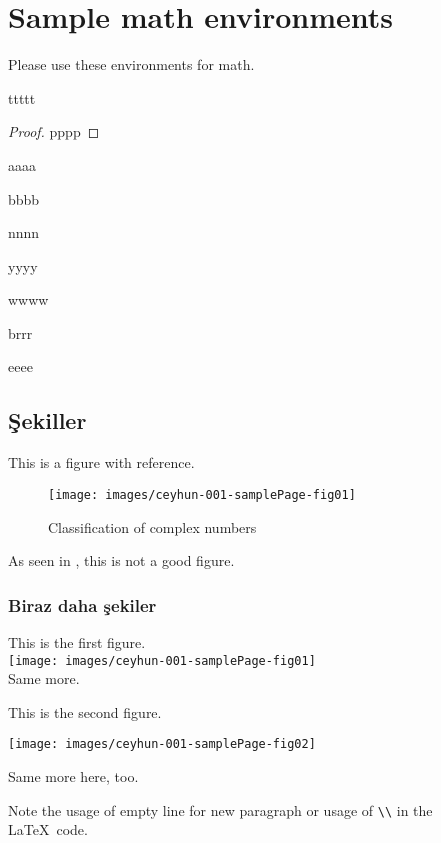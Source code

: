 \documentclass[11pt]{amsbook}
\begin{document}
\section{Sample math environments}
Please use these environments for math.


\begin{theorem}
	ttttt
\end{theorem}
\begin{proof}
	pppp
\end{proof}
\begin{lemma}
	aaaa
\end{lemma}
\begin{proposition}
	bbbb
\end{proposition}
\begin{corollary}
	nnnn
\end{corollary}
\begin{conjecture}
	yyyy
\end{conjecture}
\begin{remark}
	wwww
\end{remark}
\begin{assumption}
	brrr
\end{assumption}
\begin{example}
	eeee
\end{example}




\subsection{Şekiller}
This is a figure with reference.
\begin{figure}[htb]
	\centering
	\texttt{[image: images/ceyhun-001-samplePage-fig01]}
	\caption{Classification of complex numbers}
	\label{fig:classificationOfComplexNumbersA}
\end{figure}

As seen in , this is not a good figure.


\subsubsection{Biraz daha şekiler}

This is the first figure.\\
\texttt{[image: images/ceyhun-001-samplePage-fig01]}\\
Same more.

This is the second figure.

\texttt{[image: images/ceyhun-001-samplePage-fig02]}

Same more here, too.

Note the usage of empty line for new paragraph or usage of \verb!\\! in the \LaTeX\ code.





\end{document}
